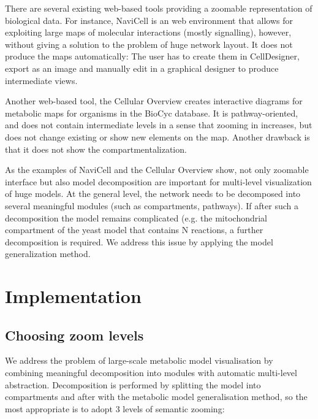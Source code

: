 \documentclass{bmcart}
\begin{document}
There are several existing web-based tools providing a zoomable representation of biological data. For instance, NaviCell\cite{Kuperstein2013} is an web environment that allows for exploiting large maps of molecular interactions (mostly signalling), however, without giving a solution to the problem of huge network layout. It does not produce the maps automatically: The user has to create them in CellDesigner, export as an image and manually edit in a graphical designer to produce intermediate views.

Another web-based tool, the Cellular Overview\cite{Latendresse2011} creates interactive diagrams for metabolic maps for organisms in the BioCyc database\cite{Caspi2012}. It is pathway-oriented, and does not contain intermediate levels in a sense that zooming in increases, but does not change existing or show new elements on the map. Another drawback is that it does not show the compartmentalization.

As the examples of NaviCell and the Cellular Overview show, not only zoomable interface but also model decomposition are important for multi-level visualization of huge models. At the general level, the network needs to be decomposed into several meaningful modules (such as compartments, pathways). If after such a decomposition the model remains complicated (e.g. the mitochondrial compartment of the yeast model\cite{Heavner12} that contains N reactions, a further decomposition is required. We address this issue by applying the model generalization method.


\section*{Implementation}

\subsection*{Choosing zoom levels}
We address the problem of large-scale metabolic model visualisation by combining meaningful decomposition into modules with automatic multi-level abstraction. Decomposition is performed by splitting the model into compartments and after with the metabolic model generalisation method, so the most appropriate is to adopt 3 levels of semantic zooming:
\end{document}
